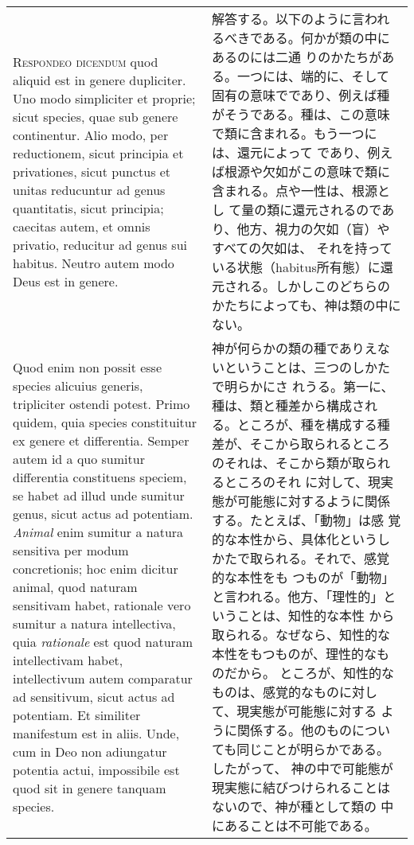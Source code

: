 \documentclass[10pt]{jsarticle}
\begin{document}
\begin{longtable}{p{21em}p{21em}}
{\scshape Respondeo dicendum} quod aliquid est in genere dupliciter.
Uno modo simpliciter et proprie; sicut species, quae sub genere
continentur.  Alio modo, per reductionem, sicut principia et
privationes, sicut punctus et unitas reducuntur ad genus quantitatis,
sicut principia; caecitas autem, et omnis privatio, reducitur ad genus
sui habitus.  Neutro autem modo Deus est in genere.

&


解答する。以下のように言われるべきである。何かが類の中にあるのには二通
りのかたちがある。一つには、端的に、そして固有の意味でであり、例えば種
がそうである。種は、この意味で類に含まれる。もう一つには、還元によって
であり、例えば根源や欠如がこの意味で類に含まれる。点や一性は、根源とし
て量の類に還元されるのであり、他方、視力の欠如（盲）やすべての欠如は、
それを持っている状態（habitus所有態）に還元される。しかしこのどちらの
かたちによっても、神は類の中にない。

\\


Quod enim non possit esse species alicuius generis, tripliciter
ostendi potest.  Primo quidem, quia species constituitur ex genere et
differentia.  Semper autem id a quo sumitur differentia constituens
speciem, se habet ad illud unde sumitur genus, sicut actus ad
potentiam.  {\itshape Animal} enim sumitur a natura sensitiva per
modum concretionis; hoc enim dicitur animal, quod naturam sensitivam
habet, rationale vero sumitur a natura intellectiva, quia {\itshape
rationale} est quod naturam intellectivam habet, intellectivum autem
comparatur ad sensitivum, sicut actus ad potentiam. Et similiter
manifestum est in aliis.  Unde, cum in Deo non adiungatur potentia
actui, impossibile est quod sit in genere tanquam species.

&

 神が何らかの類の種でありえないということは、三つのしかたで明らかにさ
れうる。第一に、種は、類と種差から構成される。ところが、種を構成する種
差が、そこから取られるところのそれは、そこから類が取られるところのそれ
に対して、現実態が可能態に対するように関係する。たとえば、「動物」は感
覚的な本性から、具体化というしかたで取られる。それで、感覚的な本性をも
つものが「動物」と言われる。他方、「理性的」ということは、知性的な本性
から取られる。なぜなら、知性的な本性をもつものが、理性的なものだから。
ところが、知性的なものは、感覚的なものに対して、現実態が可能態に対する
ように関係する。他のものについても同じことが明らかである。したがって、
神の中で可能態が現実態に結びつけられることはないので、神が種として類の
中にあることは不可能である。


\end{longtable}
\end{document}
